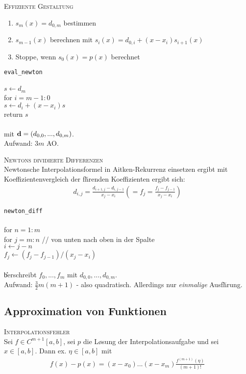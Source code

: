 \textsc{Effiziente Gestaltung}\\
\begin{enumerate}
\item $s_m(x)=d_{0,m}$ bestimmen
\item $s_{m-1}(x)$ berechnen mit $s_i(x)=d_{0,i}+(x-x_i)s_{i+1}(x)$
\item Stoppe, wenn $s_0(x)=p(x)$ berechnet
\end{enumerate}

\verb!eval_newton!\\
{\addtolength{\leftskip}{0mm}
\hrulefill\\
$s \leftarrow d_m$ \\
for $i=m-1:0$ \\
\quad $s \leftarrow d_i+(x-x_i)s$ \\
return $s$  \\
\hrulefill\\
}
mit $\mbox{\bf d}=(d_{0,0},...,d_{0,m})$.\\
Aufwand: $3m$ AO. \vspace{0.2cm}

\textsc{Newtons dividierte Differenzen}\\
Newtonsche Interpolationsformel in Aitken-Rekurrenz einsetzen ergibt mit Koeffizientenvergleich der f\u hrenden Koeffizienten ergibt sich:
\begin{align*}
d_{i,j}=\frac{d_{i+1,j}-d_{i,j-1}}{x_j-x_i} \left(=f_j = \frac{f_j-f_{j-1}}{x_j-x_i}\right)
\end{align*}

\verb!newton_diff!\\
{\addtolength{\leftskip}{0mm}
\hrulefill\\
for $n=1:m$ \\
\quad for $j=m:n$ {\scriptsize // von unten nach oben in der Spalte} \\
\qquad $i \leftarrow j-n$\\
\qquad $f_j \leftarrow (f_j-f_{j-1})/(x_j-x_i)$\\
\hrulefill\\
}
\U berschreibt $f_0,...,f_m$ mit $d_{0,0},...,d_{0,m}$.\\
Aufwand: $\frac{3}{2}m(m+1)$ - also quadratisch. Allerdings nur \emph{einmalige} Ausf\u hrung.

\subsection{Approximation von Funktionen}
\textsc{Interpolationsfehler}\\
Sei $f\in C^{m+1}[a,b]$, sei $p$ die L\o sung der Interpolationsaufgabe und sei $x\in [a,b]$. Dann ex. $\eta \in [a,b]$ mit
\begin{align*}
f(x)-p(x) = (x-x_0)...(x-x_m)\frac{f^{(m+1)}(\eta)}{(m+1)!}
\end{align*}

